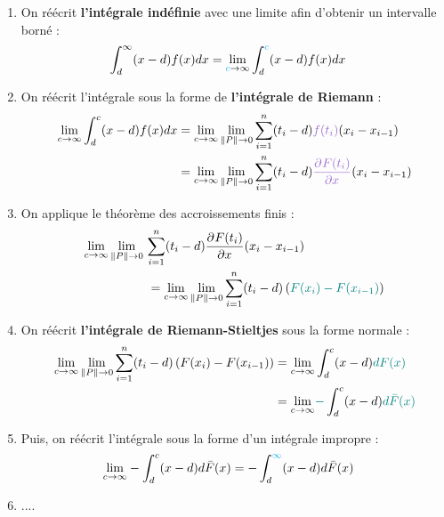 \documentclass[10pt, french]{article}
\begin{document}
\begin{multicols*}{2}
\begin{enumerate}[resume]
	\item	On réécrit \textbf{l'intégrale indéfinie} avec une limite afin d'obtenir un intervalle borné :
		\begin{align}
		\int_{d}^{\infty} (x - d) f(x) dx
			&=	\underset{{\color{cyan}c} \rightarrow \infty}{\lim} \int_{d}^{{\color{cyan}c}} (x - d) f(x) dx	
		\end{align}
	\item	On réécrit l'intégrale sous la forme de \textbf{l'intégrale de Riemann} :
		\begin{align}
		\limz{c}{\infty} \int_{d}^{c} (x - d) f(x) dx	
			&=	\limz{c}{\infty} \lim_{\lVert P \rVert \rightarrow 0} \sumz{n}{i = 1} (t_{i} - d) {\color{amethyst}f(t_{i})}(x_{i} - x_{i - 1})	\nonumber\\
			&=	\limz{c}{\infty} \lim_{\lVert P \rVert \rightarrow 0} \sumz{n}{i = 1} (t_{i} - d) {\color{amethyst}\deriv{x}{F(t_{i})}}(x_{i} - x_{i - 1})	
		\end{align}
	\item	On applique le théorème des accroissements finis : 
		\begin{align}
		\limz{c}{\infty} \lim_{\lVert P \rVert \rightarrow 0}\ &\sumz{n}{i = 1} (t_{i} - d) \deriv{x}{F(t_{i})}(x_{i} - x_{i - 1})	\nonumber\\
			&=	\limz{c}{\infty} \lim_{\lVert P \rVert \rightarrow 0} \sumz{n}{i = 1} (t_{i} - d) \left({\color{teal}F(x_{i}) - F(x_{i - 1})}\right)	
		\end{align}
	\item	On réécrit \textbf{l'intégrale de Riemann-Stieltjes} sous la forme normale :
		\begin{align*}
		\underset{c \rightarrow \infty}{\lim} \lim_{\lVert P \rVert \rightarrow 0} \overset{n}{\underset{i = 1}{\sum}} (t_{i} - d) \left(F(x_{i}) - F(x_{i - 1})\right)
			&=	\underset{c \rightarrow \infty}{\lim} \int_{d}^{c} (x - d) {\color{teal}dF(x)}	\\
			&=	\underset{c \rightarrow \infty}{\lim} {\color{teal}-}\int_{d}^{c} (x - d) {\color{teal}d\bar{F}(x)}
		\end{align*}	
	\item	Puis, on réécrit l'intégrale sous la forme d'un intégrale impropre :
		\begin{align*}
		\underset{c \rightarrow \infty}{\lim} -\int_{d}^{c} (x - d) d\bar{F}(x)
		&=	-\int_{d}^{{\color{cyan}\infty}} (x - d) d\bar{F}(x)
		\end{align*}
	\item	....
\end{enumerate}

\end{multicols*}
\end{document}

